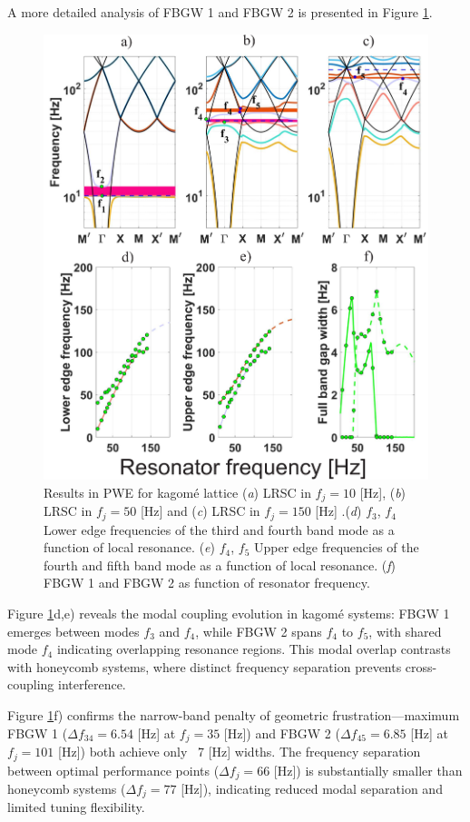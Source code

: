 \documentclass[review,numbers,sort&compress]{elsarticle}
\begin{document}
A more detailed analysis of FBGW 1 and FBGW 2 is presented in Figure \ref{pwe_disp_hex_all_res}.
\newpage
\begin{figure}[htb]
	\centering
	\includegraphics[width=.8\textwidth]{2_5_disp_frf_kag.pdf}
	\caption{Results in PWE for kagomé lattice (\textit{a}) LRSC in $f_j=10$ [Hz], (\textit{b}) LRSC in $f_j=50$ [Hz] and (\textit{c}) LRSC in $f_j=150$ [Hz] .(\textit{d}) $f_3$, $f_4$ Lower edge frequencies of the third and fourth band mode as a function of local resonance. (\textit{e}) $f_4$, $f_5$ Upper edge frequencies of the fourth and fifth band mode as a function of local resonance. (\textit{f}) FBGW 1 and FBGW 2 as function of resonator frequency. }
	\label{pwe_disp_hex_all_res}
\end{figure}

Figure \ref{pwe_disp_hex_all_res}d,e) reveals the modal coupling evolution in kagomé systems: FBGW 1 emerges between modes \( f_3 \) and \( f_4 \), while FBGW 2 spans \( f_4 \) to \( f_5 \), with shared mode \( f_4 \) indicating overlapping resonance regions. This modal overlap contrasts with honeycomb systems, where distinct frequency separation prevents cross-coupling interference.

Figure \ref{pwe_disp_hex_all_res}f) confirms the narrow-band penalty of geometric frustration—maximum FBGW 1 (\( \Delta f_{34} = 6.54 \) [Hz] at \( f_j = 35 \) [Hz]) and FBGW 2 (\( \Delta f_{45} = 6.85 \) [Hz] at \( f_j = 101 \) [Hz]) both achieve only ~7 [Hz] widths. The frequency separation between optimal performance points (\( \Delta f_j = 66 \) [Hz]) is substantially smaller than honeycomb systems (\( \Delta f_j = 77 \) [Hz]), indicating reduced modal separation and limited tuning flexibility. 
\end{document}
